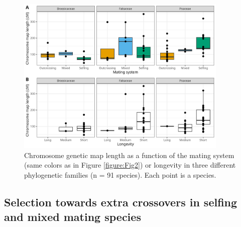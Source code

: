 \documentclass{article}
\begin{document}
\begin{figure}[h!]
  \includegraphics[width=0.9\textwidth]{figures/Fig3.jpeg}
  \centering
  \caption{Chromosome genetic map length as a function of the mating system (same colors as in Figure \ref{figure:Fig2}) or longevity in three different phylogenetic families (n = 91 species). Each point is a species.
  }
  \label{figure:Fig3}
\end{figure}



\subsection*{Selection towards extra crossovers in selfing and mixed mating species}
\end{document}
